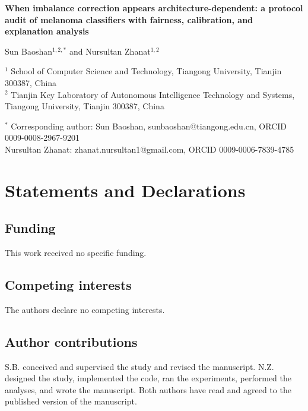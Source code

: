 \documentclass[11pt]{article}
\begin{document}
\begin{center}
{\Large\bfseries When imbalance correction appears architecture-dependent: a protocol audit of melanoma classifiers with fairness, calibration, and explanation analysis}

\vspace{1.2em}

{\large Sun Baoshan$^{1,2,*}$ and Nursultan Zhanat$^{1,2}$}

\vspace{0.8em}

{\small
$^{1}$ School of Computer Science and Technology, Tiangong University, Tianjin 300387, China\\
$^{2}$ Tianjin Key Laboratory of Autonomous Intelligence Technology and Systems, Tiangong University, Tianjin 300387, China
}

\vspace{0.8em}

{\small
$^{*}$ Corresponding author: Sun Baoshan, sunbaoshan@tiangong.edu.cn, ORCID 0009-0008-2967-9201\\
Nursultan Zhanat: zhanat.nursultan1@gmail.com, ORCID 0009-0006-7839-4785
}\end{center}

\vspace{1.5em}

\section*{Statements and Declarations}

\subsection*{Funding}
This work received no specific funding.

\subsection*{Competing interests}
The authors declare no competing interests.

\subsection*{Author contributions}
S.B. conceived and supervised the study and revised the manuscript. N.Z. designed the study, implemented the code, ran the experiments, performed the analyses, and wrote the manuscript. Both authors have read and agreed to the published version of the manuscript.
\end{document}
